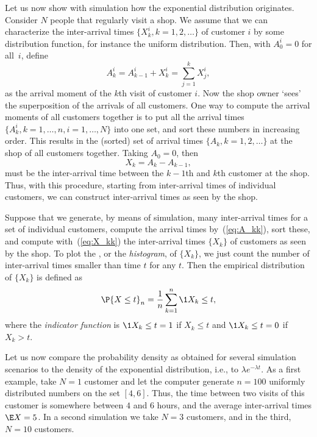 Let us now show with simulation how the exponential distribution
originates. Consider $N$ people that regularly visit a shop. We assume
that we can characterize the inter-arrival times
$\{X_k^i, k=1,2, \ldots\}$ of customer $i$ by some distribution
function, for instance the uniform distribution. Then, with
$A_{0}^i=0$ for all~$i$, define 
\begin{equation}\label{eq:A_kk}
A_k^i = A_{k-1}^i + X_k^i = \sum_{j=1}^k X_j^i,
\end{equation}
as the arrival moment of the $k$th visit of customer $i$.  Now the
shop owner `sees' the superposition of the arrivals of all
customers. One way to compute the arrival moments of all customers
together is to put all the arrival times
$\{A_k^i, k=1,\ldots,n, i=1,\ldots,N\}$ into one set, and sort these
numbers in increasing order. This results in the (sorted) set of
arrival times $\{A_k, k=1,2,\ldots\}$ at the shop of all customers together. Taking $A_0=0$,  then
\begin{equation}\label{eq:X_kk}
X_k = A_k - A_{k-1},
\end{equation}
must be the inter-arrival time between the $k-1$th and
$k$th customer at the shop.  Thus, with this procedure, starting from inter-arrival times of
individual customers, we can construct inter-arrival times as seen by
the shop.


Suppose that we  generate, by means of simulation, many inter-arrival times for a set of individual customers, compute the arrival times by~(\ref{eq:A_kk}), sort these, and compute with~(\ref{eq:X_kk}) the inter-arrival times $\{X_k\}$ of customers as seen by the shop.  To plot the , or the \emph{histogram}, of $\{X_k\}$, we just  count the
number of inter-arrival times smaller than time $t$ for any $t$.  Then the empirical distribution of $\{X_k\}$ is defined as
\begin{equation*}
  \P{X \leq t}_{n} = \frac1{n}\sum_{k=1}^{n} \1{X_k\leq t},
\end{equation*}
where the \emph{indicator function} is $\1{X_k\leq t}=1$ if $X_k\leq t$ and $\1{X_k\leq t}=0$
if $X_k> t$.  

Let us now compare the probability density as
obtained for several simulation scenarios to the density of the
exponential distribution, i.e., to $\lambda e^{-\lambda t}$.  As a
first example, take $N=1$ customer and let the computer generate
$n=100$ uniformly distributed numbers on the set $[4, 6]$.  Thus, the
time between two visits of this customer is somewhere between $4$ and
$6$ hours, and the average inter-arrival times $\E X = 5$. In a second
simulation we take $N=3$ customers, and in the third, $N=10$
customers. 

